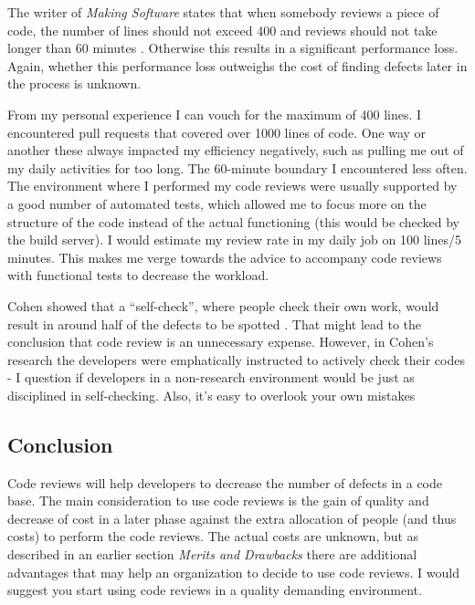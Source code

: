 The writer of \textit{Making Software} states that when somebody reviews a piece of code,
the number of lines should not exceed 400 and reviews should not take longer than 60 minutes \autocite[330-332]{MAKING_SOFTWARE} \autocite[81]{cohen2006best} \autocite[470--471]{Dunsmore:2000:OIF:337180.337343}.
Otherwise this results in a significant performance loss.
Again, whether this performance loss outweighs the cost of finding defects later in the process is unknown.

From my personal experience I can vouch for the maximum of 400 lines.
I encountered pull requests that covered over 1000 lines of code.
One way or another these always impacted my efficiency negatively, such as pulling me out of my daily activities for too long.
The 60-minute boundary I encountered less often.
The environment where I performed my code reviews were usually supported by a good number of automated tests,
which allowed me to focus more on the structure of the code instead of the actual functioning (this would be checked by the build server).
I would estimate my review rate in my daily job on 100 lines/5 minutes.
This makes me verge towards the advice to accompany code reviews with functional tests to decrease the workload.

Cohen showed that a ``self-check'', where people check their own work, would result in around half of the defects to be spotted \autocite[336]{MAKING_SOFTWARE}.
That might lead to the conclusion that code review is an unnecessary expense.
However, in Cohen's research the developers were emphatically instructed to actively check their codes -
I question if developers in a non-research environment would be just as disciplined in self-checking. Also, it's easy to overlook your own mistakes

\subsection*{Conclusion}

Code reviews will help developers to decrease the number of defects in a code base.
The main consideration to use code reviews is the gain of quality and decrease of cost in a later phase against the extra allocation of people (and thus costs) to perform the code reviews.
The actual costs are unknown, but as described in an earlier section \textit{Merits and Drawbacks} there are additional advantages that may help an organization to decide to use code reviews.
I would suggest you start using code reviews in a quality demanding environment.
